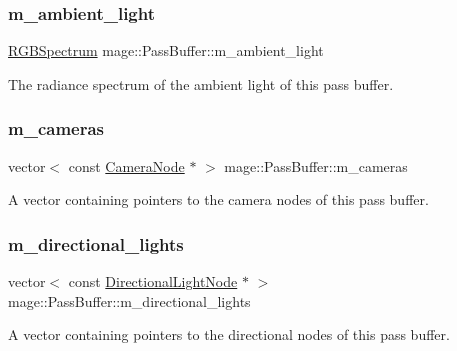 \subsubsection{\texorpdfstring{m\+\_\+ambient\+\_\+light}{m\_ambient\_light}}
{\footnotesize\ttfamily \hyperlink{structmage_1_1_r_g_b_spectrum}{R\+G\+B\+Spectrum} mage\+::\+Pass\+Buffer\+::m\+\_\+ambient\+\_\+light\hspace{0.3cm}{\ttfamily [private]}}

The radiance spectrum of the ambient light of this pass buffer. \hypertarget{structmage_1_1_pass_buffer_a4885440342be6a2cd11002781704a63f}{}\label{structmage_1_1_pass_buffer_a4885440342be6a2cd11002781704a63f} 
\subsubsection{\texorpdfstring{m\+\_\+cameras}{m\_cameras}}
{\footnotesize\ttfamily vector$<$ const \hyperlink{classmage_1_1_camera_node}{Camera\+Node} $\ast$ $>$ mage\+::\+Pass\+Buffer\+::m\+\_\+cameras\hspace{0.3cm}{\ttfamily [private]}}

A vector containing pointers to the camera nodes of this pass buffer. \hypertarget{structmage_1_1_pass_buffer_a20f2a4518ea6121e6c9ae0ed9d263435}{}\label{structmage_1_1_pass_buffer_a20f2a4518ea6121e6c9ae0ed9d263435} 
\subsubsection{\texorpdfstring{m\+\_\+directional\+\_\+lights}{m\_directional\_lights}}
{\footnotesize\ttfamily vector$<$ const \hyperlink{namespacemage_a7637b5351fc0f66a10badd80ebb35899}{Directional\+Light\+Node} $\ast$ $>$ mage\+::\+Pass\+Buffer\+::m\+\_\+directional\+\_\+lights\hspace{0.3cm}{\ttfamily [private]}}

A vector containing pointers to the directional nodes of this pass buffer. \hypertarget{structmage_1_1_pass_buffer_a3691cc52fe3bc5f1c86bf0dad36061d8}{}\label{structmage_1_1_pass_buffer_a3691cc52fe3bc5f1c86bf0dad36061d8} 
